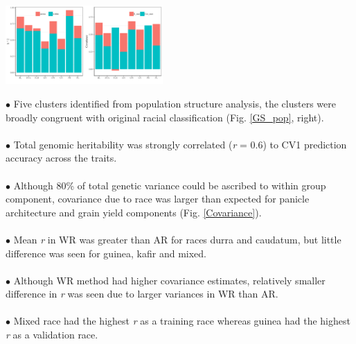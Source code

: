 \documentclass[a0,portrait]{a0poster}
\begin{document}
\begin{minipage}[c]{\linewidth}
\begin{framed}
\begin{multicols}{2}
\fontsize{30}{25} \selectfont 
\begin{center}
\includegraphics[width=0.45\textwidth]{figures/herit_Cov_CV1}
\label{Covariance}
\end{center}
\smallskip
$\bullet$ Five clusters identified from population structure analysis, the clusters were broadly congruent with original racial classification (Fig. \ref{GS_pop}, right).\\\\
$\bullet$ Total genomic heritability was strongly correlated (\textit{r} = 0.6) to CV1 prediction accuracy across the traits.\\\\
$\bullet$ Although 80\% of total genetic variance could be ascribed to within group component, covariance due to race was larger than expected for panicle architecture and grain yield components (Fig. \ref{Covariance}).\\\\
$\bullet$ Mean \textit{r} in WR was greater than AR for races durra and caudatum, but little difference was seen for guinea, kafir and mixed.\\\\
$\bullet$ Although WR method had higher covariance estimates, relatively smaller difference in \textit{r} was seen due to larger variances in WR than AR.\\\\
$\bullet$ Mixed race had the highest \textit{r} as a training race whereas guinea had the highest \textit{r} as a validation race.
\newpage
\begin{center}
\setlength{\tabcolsep}{15pt}

\end{center}
\end{multicols}
\end{framed}
\end{minipage}
\end{document}
